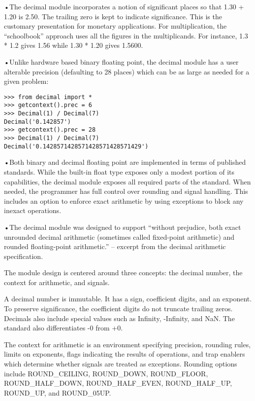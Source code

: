 •The decimal module incorporates a notion of significant places so that 1.30 + 1.20 is 2.50. The trailing zero is kept to indicate significance. This is the customary presentation for monetary applications. For multiplication, the “schoolbook” approach uses all the figures in the multiplicands. For instance, 1.3 * 1.2 gives 1.56 while 1.30 * 1.20 gives 1.5600.


•Unlike hardware based binary floating point, the decimal module has a user alterable precision (defaulting to 28 places) which can be as large as needed for a given problem:

\begin{lstlisting}
>>> from decimal import *
>>> getcontext().prec = 6
>>> Decimal(1) / Decimal(7)
Decimal('0.142857')
>>> getcontext().prec = 28
>>> Decimal(1) / Decimal(7)
Decimal('0.1428571428571428571428571429')
\end{lstlisting}


•Both binary and decimal floating point are implemented in terms of published standards. While the built-in float type exposes only a modest portion of its capabilities, the decimal module exposes all required parts of the standard. When needed, the programmer has full control over rounding and signal handling. This includes an option to enforce exact arithmetic by using exceptions to block any inexact operations.


•The decimal module was designed to support “without prejudice, both exact unrounded decimal arithmetic (sometimes called fixed-point arithmetic) and rounded floating-point arithmetic.” – excerpt from the decimal arithmetic specification.


The module design is centered around three concepts: the decimal number, the context for arithmetic, and signals.

A decimal number is immutable. It has a sign, coefficient digits, and an exponent. To preserve significance, the coefficient digits do not truncate trailing zeros. Decimals also include special values such as Infinity, -Infinity, and NaN. The standard also differentiates -0 from +0.

The context for arithmetic is an environment specifying precision, rounding rules, limits on exponents, flags indicating the results of operations, and trap enablers which determine whether signals are treated as exceptions. Rounding options include ROUND\_CEILING, ROUND\_DOWN, ROUND\_FLOOR, ROUND\_HALF\_DOWN, ROUND\_HALF\_EVEN, ROUND\_HALF\_UP, ROUND\_UP, and ROUND\_05UP.

